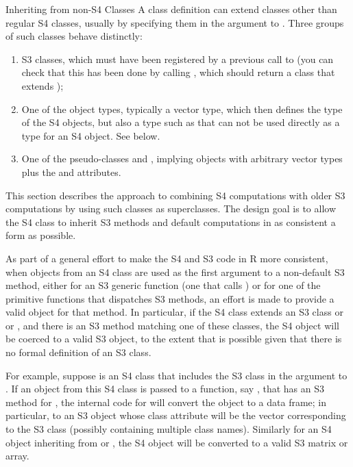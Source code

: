 \begin{Section}{Inheriting from non-S4 Classes}
A class definition can extend classes other than
regular S4 classes, usually by specifying them in the
 argument to .  Three groups
of such classes behave distinctly:
\begin{enumerate}

\item 
S3 classes, which must have been registered by a previous call to
 (you can check that this has been done
by calling , which should return a class that
extends );

\item 
One of the \R{} object types, typically a vector type, which then
defines the type of the S4 objects, but also a type such as
 that can not be used directly as a type
for an S4 object.  See
below.

\item 
One of the pseudo-classes 
and , implying objects with
arbitrary vector types plus the  and 
attributes.

\end{enumerate}


This section describes the approach to combining S4 computations
with older S3 computations by using such classes as superclasses. The
design goal is to allow the S4 class to inherit S3 methods and
default computations in as consistent a form as possible.

As part of a general effort to make the S4 and S3 code in R more
consistent, when objects from an S4 class are used as the first
argument to a non-default S3 method, either for an S3 generic function
(one that calls ) or for one of the primitive
functions that dispatches S3 methods, an effort is made to provide a
valid object for that method.  In particular, if the S4 class extends
an S3 class or  or , and there is an S3
method matching one of these classes, the S4 object will be coerced to
a valid S3 object, to the extent that is possible given that there is
no formal definition of an S3 class.

For example, suppose  is an S4 class that includes the
S3 class  in the  argument to
.  If an object from this S4 class is passed to
a function, say , that has an S3 method for
, the internal code for 
will convert the object to a data frame; in particular, to an S3
object whose class attribute will be the vector corresponding to the
S3 class (possibly containing multiple class names). Similarly for an
S4 object inheriting from  or , the S4
object will be converted to a valid S3 matrix or array.


\end{Section}
